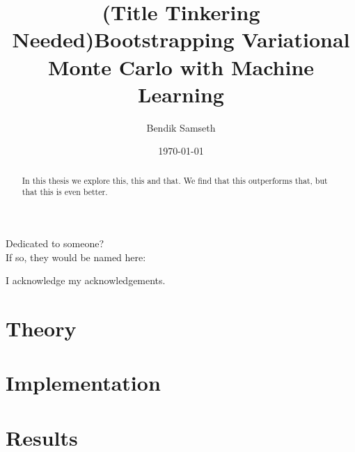 \documentclass[twoside,english]{uiofysmaster}
\author{Bendik Samseth}
\title{(Title Tinkering Needed)Bootstrapping Variational Monte Carlo with Machine Learning}
\date{\monthyeardate\today}
\begin{document}
\maketitle

\begin{abstract}
    In this thesis we explore this, this and that. We find that this outperforms that, but that this is even better.
\end{abstract}


\begin{dedication}
  Dedicated to someone?
  \\\vspace{12pt}
  If so, they would be named here:
\end{dedication}

\begin{acknowledgements}
  I acknowledge my acknowledgements.
\end{acknowledgements}

\tableofcontents



\part{Theory}





\part{Implementation}

\part{Results}


\printbibliography[heading=bibintoc, title={References}]
\end{document}
